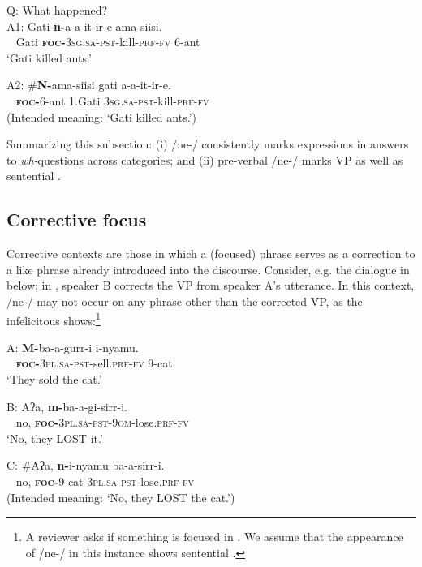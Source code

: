 \documentclass[output=paper,modfonts]{langscibook}
\begin{document}
\ea\label{ex:landmann:15}
Q: What happened?\\
\gll A1: Gati \textbf{n-}a-a-it-ir-e ama-siisi.\\
    ~ Gati \textsc{\textbf{foc}}\textbf{-}\textsc{3sg}.\textsc{sa}-\textsc{pst}-kill-\textsc{prf}-\textsc{fv} 6-ant\\
\glt ‘Gati killed ants.’
\z

\ea\label{ex:landmann:16}
\gll A2: \#\textbf{N-}ama-siisi gati a-a-it-ir-e.\\
    ~ \textsc{\textbf{foc}}\textbf{-}6-ant 1.Gati \textsc{3sg}.\textsc{sa}-\textsc{pst}-kill-\textsc{prf}-\textsc{fv}\\
\glt (Intended meaning: ‘Gati killed ants.’)
\z

Summarizing this subsection: (i) /ne-/ consistently marks  expressions in answers to \textit{wh-}questions across categories; and (ii) pre-verbal /ne-/ marks VP  as well as sentential .


\subsection{Corrective focus}



Corrective  contexts are those in which a (focused) phrase serves as a correction to a like phrase already introduced into the discourse. Consider, e.g. the dialogue in  below; in , speaker B corrects the VP from speaker A’s utterance. In this context, /ne-/ may not occur on any phrase other than the corrected VP, as the infelicitous  shows:\footnote{A reviewer asks if something is focused in . We assume that the appearance of /ne-/ in this instance shows sentential .}


\ea\label{ex:landmann:17}
  \gll A: \textbf{M-}ba-a-gurr-i i-nyamu.\\
     ~ \textsc{\textbf{foc}}\textbf{-}\textsc{3pl}.\textsc{sa}-\textsc{pst}-sell.\textsc{prf}-\textsc{fv} 9-cat\\
\glt ‘They sold the cat.’
\z

\ea\label{ex:landmann:18}
\gll B: Aʔa, \textbf{m-}ba-a-gi-sirr-i.\\
    ~ no, \textsc{\textbf{foc-}}\textsc{3pl}.\textsc{sa}-\textsc{pst}-\textsc{9om}-lose.\textsc{prf}-\textsc{fv}\\
\glt ‘No, they LOST it.’
\z

\ea\label{ex:landmann:19}
\gll C: \#Aʔa, \textbf{n-}i-nyamu ba-a-sirr-i.\\
    ~ no, \textsc{\textbf{foc-}}9-cat \textsc{3pl}.\textsc{sa}-\textsc{pst}-lose.\textsc{prf}-\textsc{fv}\\
\glt (Intended meaning: ‘No, they LOST the cat.’)
\z
\end{document}
